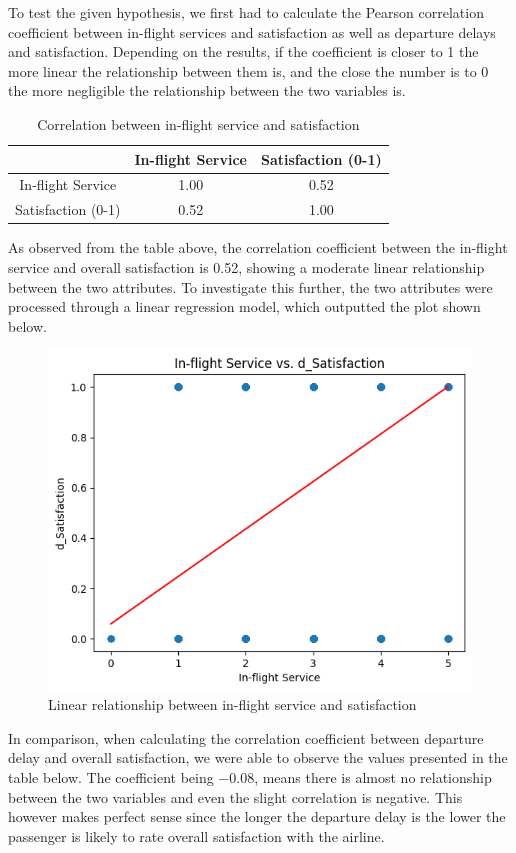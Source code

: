 \documentclass[11pt]{article}
\begin{document}
To test the given hypothesis, we first had to calculate the Pearson correlation coefficient between in-flight services and satisfaction as well as departure delays and satisfaction. Depending on the results, if the coefficient is closer to 1 the more linear the relationship between them is, and the close the number is to 0 the more negligible the relationship between the two variables is. 

\begin{table}[!h]
    \centering
    \begin{tabular}{|c|c|c|}
        \hline
        &  In-flight Service & Satisfaction (0-1) \\
        \hline
        In-flight Service   &   1.00  &  0.52 \\
        \hline
        Satisfaction (0-1)     &   0.52  &  1.00 \\
        \hline
    \end{tabular}
    \caption{Correlation between in-flight service and satisfaction}
    \label{tab:corr-ifs-s}
\end{table}

As observed from the table above, the correlation coefficient between the in-flight service and overall satisfaction is \num{0.52}, showing a moderate linear relationship between the two attributes. To investigate this further, the two attributes were processed through a linear regression model, which outputted the plot shown below.

\begin{figure}[h]
\centering
\includegraphics[width=0.5\linewidth]{project_files/project_21_1.png}
\caption{Linear relationship between in-flight service and satisfaction}
\end{figure}

In comparison, when calculating the correlation coefficient between departure delay and overall satisfaction, we were able to observe the values presented in the table below. The coefficient being \num{-0.08}, means there is almost no relationship between the two variables and even the slight correlation is negative. This however makes perfect sense since the longer the departure delay is the lower the passenger is likely to rate overall satisfaction with the airline.
\end{document}
